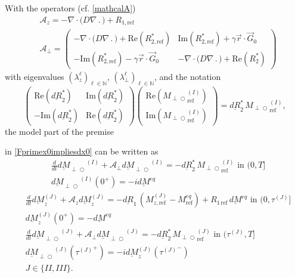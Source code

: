\documentclass{ws-m3as}
\newcommand{\uld}[1]{\underline{d#1}}
\renewcommand\Re{\mathrm{Re}}
\renewcommand\Im{\mathrm{Im}}
\def\Mpp{M_{\perp\!\!\!\!\!\bigcirc}}
\def\uldMpp{\uld{M}_{\perp\!\!\!\!\!\bigcirc}}
\newcommand{\revision}[1]{{ #1}}
\newcommand{\Margin}[1]{}
\begin{document}
With the operators (cf. \eqref{mathcalA})
\begin{equation}\label{mathcalA12}
\begin{aligned}
&\mathcal{A}_z=
-\nabla\cdot\bigl(D \nabla \,.\,\bigr)+R_{1,\text{ref}}\\
&\mathcal{A}_\perp=
\left(\begin{array}{cc}
-\nabla\cdot\bigl(D \nabla \,.\,\bigr)+\Re(R_{2,\text{ref}}^*)&\Im(R_{2,\text{ref}}^*)+\gamma\vec r \cdot \vec G_0\\ 
-\Im(R_{2,\text{ref}}^*)-\gamma\vec r \cdot \vec G_0&-\nabla\cdot\bigl(D \nabla \,.\,\bigr)+\Re(R_2^*)
\end{array}\right)
\end{aligned}
\end{equation}
with eigenvalues $(\lambda_z^\ell)_{\ell\in\mathbb{N}}$, $(\lambda_\perp^\ell)_{\ell\in\mathbb{N}}$, and the notation
\[
\left(\begin{array}{cc}
\Re(\uld{R}_2^*)&\Im(\uld{R}_2^*)\\ 
-\Im(\uld{R}_2^*)&\Re(\uld{R}_2^*)
\end{array}\right)
\left(\begin{array}{c}
\Re({\Mpp}_{\text{ref}}^{(I)})\\
\Im({\Mpp}_{\text{ref}}^{(I)})
\end{array}\right)
=\uld{R}_2^*\,{\Mpp}_{\text{ref}}^{(I)},
\]
the model part of the 
\revision{premise}
\Margin{R1 7.} 
in \eqref{Fprimex0impliesdx0} can be written as 
\begin{equation}\label{FImodprime0}
\begin{aligned}
&\frac{d}{dt}{\uldMpp}^{(I)}+\mathcal{A}_\perp{\uldMpp}^{(I)} 
=-\uld{R}_2^*\,{\Mpp}_{\text{ref}}^{(I)}
\text{ in }(0,T]\\
&{\uldMpp}^{(I)}(0^+)=-i\uld{M}^{eq}
\end{aligned}
\end{equation}
\begin{equation}\label{FJmodprime0}
\begin{aligned}
&\frac{d}{dt}\uld{M}_z^{(J)}+\mathcal{A}_z\uld{M}_z^{(J)} 
=-\uld{R}_1\,(M_{z,\text{ref}}^{(J)}-M^{eq}_{\text{ref}})+R_{1\,\text{ref}}\,\uld{M}^{eq}
\text{ in }(0,\tau^{(J)}]\\
&\uld{M}_z^{(J)}(0^+)=-\uld{M}^{eq}
\\
&\frac{d}{dt}{\uldMpp}^{(J)}+\mathcal{A}_\perp{\uldMpp}^{(J)} 
=-\uld{R}_2^*\,{\Mpp}_{\text{ref}}^{(J)}
\text{ in }(\tau^{(J)},T]\\
&{\uldMpp}^{(J)}({\tau^{(J)}}^+)=-i\uld{M}_z^{(J)}({\tau^{(J)}}^-)\\
&J\in\{II,III\}.
\end{aligned}
\end{equation}
\end{document}
